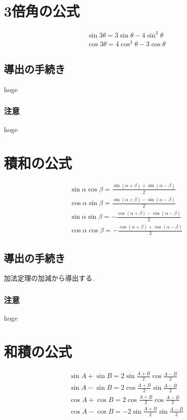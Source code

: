 \documentclass[a4paper]{report}
\begin{document}
\section{3倍角の公式}
\begin{equation}
    \begin{array}{l}
        \sin3\theta=3\sin\theta-4\sin^3\theta\\
        \cos3\theta=4\cos^3\theta-3\cos\theta
    \end{array}
\end{equation}
\subsection{導出の手続き}
hoge
\subsubsection{注意}
hoge

\section{積和の公式}
\begin{equation}
    \begin{array}{l}
        \sin\alpha\cos\beta=\frac{\sin(\alpha+\beta)+\sin(\alpha-\beta)}{2}\\
        \cos\alpha\sin\beta=\frac{\sin(\alpha+\beta)-\sin(\alpha-\beta)}{2}\\
        \sin\alpha\sin\beta=-\frac{\cos(\alpha+\beta)-\cos(\alpha-\beta)}{2}\\
        \cos\alpha\cos\beta=-\frac{\cos(\alpha+\beta)+\cos(\alpha-\beta)}{2}
    \end{array}
\end{equation}
\subsection{導出の手続き}
加法定理の加減から導出する.
\subsubsection{注意}
hoge

\section{和積の公式}
\begin{equation}
    \begin{array}{l}
        \sin A+\sin B=2\sin\frac{A+B}{2}\cos\frac{A-B}{2}\\
        \sin A-\sin B=2\cos\frac{A+B}{2}\sin\frac{A-B}{2}\\
        \cos A+\cos B=2\cos\frac{A+B}{2}\cos\frac{A-B}{2}\\
        \cos A-\cos B=-2\sin\frac{A+B}{2}\sin\frac{A-B}{2}
    \end{array}
\end{equation}
\end{document}
